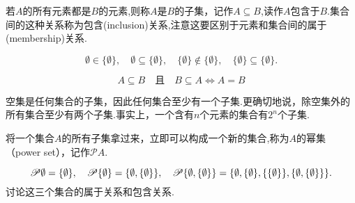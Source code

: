 若$A$的所有元素都是$B$的元素,则称$A$是$B$的子集，记作$A\subseteq B$,读作$A$包含于$B$.集合间的这种关系称为包含(inclusion)关系,注意这要区别于元素和集合间的属于(membership)关系.

\begin{example}
    \[
        \emptyset\in\{\emptyset\},\quad
        \emptyset\subseteq\{\emptyset\},\quad \{\emptyset\}\notin\{\emptyset\},\quad \{\emptyset\}\subseteq\{\emptyset\}.
    \]
\end{example}

\begin{example}
    \[A\subseteq B \quad\textit{且}\quad B\subseteq A\iff A=B\]
\end{example}

空集是任何集合的子集，因此任何集合至少有一个子集.更确切地说，除空集外的所有集合至少有两个子集.事实上，一个含有$n$个元素的集合有$2^n$个子集.

将一个集合$A$的所有子集拿过来，立即可以构成一个新的集合,称为$A$的幂集（power set），记作$\mathscr{P}A$.

\begin{example}
    \[\mathscr{P}\emptyset=\{\emptyset\},\quad
    \mathscr{P}\{\emptyset\}=\{\emptyset,\{\emptyset\}\},\quad
    \mathscr{P}\{\emptyset,\{\emptyset\}\}=\{\emptyset,\{\emptyset\},\{\{\emptyset\}\},\{\emptyset,\{\emptyset\}\}\}.\]
    讨论这三个集合的属于关系和包含关系.
\end{example}

